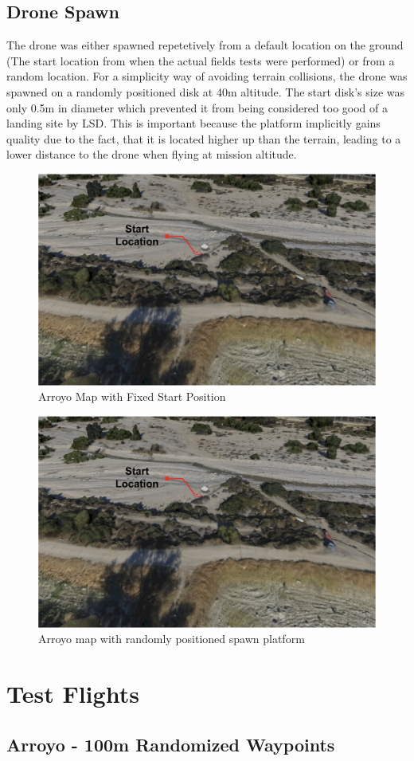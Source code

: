 \subsection{Drone Spawn}
The drone was either spawned repetetively from a default location on the ground (The start location from when the actual fields tests were performed) or from a random location. For a simplicity way of  avoiding terrain collisions, the drone was spawned on a randomly positioned disk at 40m altitude. The start disk's size was only 0.5m in diameter which prevented it from being considered too good of a landing site by LSD. This is important because the platform implicitly gains quality due to the fact, that it is located higher up than the terrain, leading to a lower distance to the drone when flying at mission altitude.
\begin{figure}
    \centering
    \includegraphics[scale=0.42]{images/evaluation/arroyo_with_start.png}
    \caption{Arroyo Map with Fixed Start Position}
\end{figure}
\begin{figure}
    \centering
    \includegraphics[scale=0.42]{images/evaluation/arroyo_with_start.png}
    \caption{Arroyo map with randomly positioned spawn platform}
\end{figure}
\section{Test Flights}
\subsection{Arroyo - 100m Randomized Waypoints}





